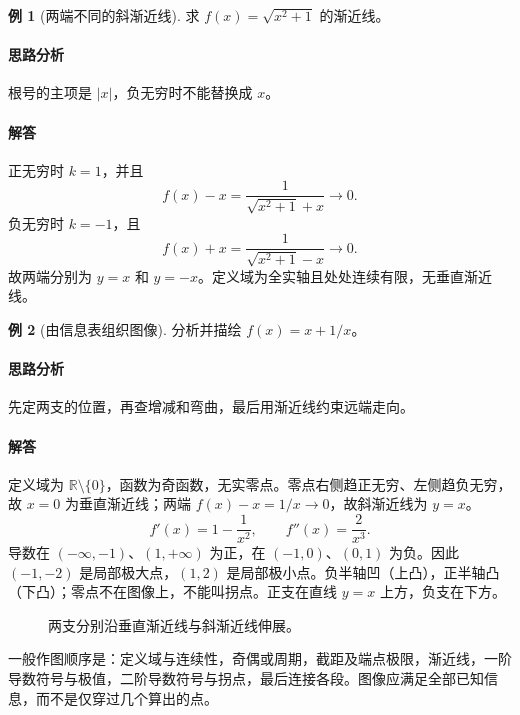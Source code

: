 \documentclass[UTF8,fontset=fandol,12pt,oneside,openany]{ctexrep}
\newcommand{\R}{\mathbb R}
\theoremstyle{definition}
\newtheorem{example}{例}[chapter]
\begin{document}
\begin{example}[两端不同的斜渐近线]
求 $f(x)=\sqrt{x^2+1}$ 的渐近线。
\end{example}
\paragraph{思路分析}根号的主项是 $|x|$，负无穷时不能替换成 $x$。
\paragraph{解答}正无穷时 $k=1$，并且
\[f(x)-x=\frac1{\sqrt{x^2+1}+x}\longrightarrow0.\]
负无穷时 $k=-1$，且
\[f(x)+x=\frac1{\sqrt{x^2+1}-x}\longrightarrow0.\]
故两端分别为 $y=x$ 和 $y=-x$。定义域为全实轴且处处连续有限，无垂直渐近线。

\begin{example}[由信息表组织图像]
分析并描绘 $f(x)=x+1/x$。
\end{example}
\paragraph{思路分析}先定两支的位置，再查增减和弯曲，最后用渐近线约束远端走向。
\paragraph{解答}定义域为 $\R\setminus\{0\}$，函数为奇函数，无实零点。零点右侧趋正无穷、左侧趋负无穷，故 $x=0$ 为垂直渐近线；两端 $f(x)-x=1/x\to0$，故斜渐近线为 $y=x$。
\[f'(x)=1-\frac1{x^2},\qquad f''(x)=\frac2{x^3}.\]
导数在 $(-\infty,-1)$、$(1,+\infty)$ 为正，在 $(-1,0)$、$(0,1)$ 为负。因此 $(-1,-2)$ 是局部极大点，$(1,2)$ 是局部极小点。负半轴凹（上凸），正半轴凸（下凸）；零点不在图像上，不能叫拐点。正支在直线 $y=x$ 上方，负支在下方。
\begin{figure}[htbp]
\centering
{}
\caption{两支分别沿垂直渐近线与斜渐近线伸展。}
\end{figure}
一般作图顺序是：定义域与连续性，奇偶或周期，截距及端点极限，渐近线，一阶导数符号与极值，二阶导数符号与拐点，最后连接各段。图像应满足全部已知信息，而不是仅穿过几个算出的点。
\end{document}
